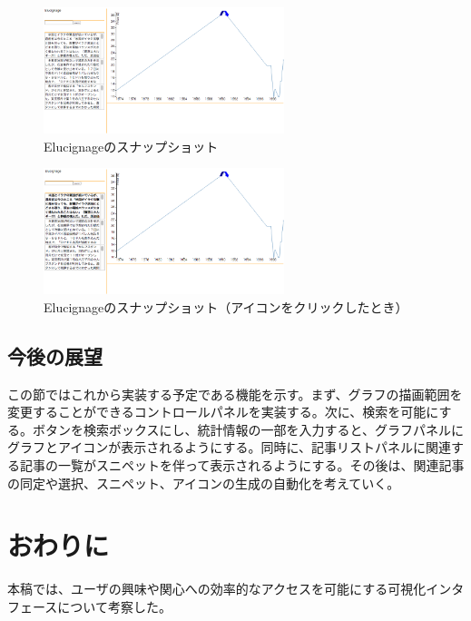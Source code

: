 \documentclass{matsushita-zemi}
\begin{document}
\begin{figure}[tb]
  \begin{center}
   \includegraphics[width=7cm,bb=0 0 852 448]{Elucignageprototype.png}
  \end{center}
 \caption{Elucignageのスナップショット}
 \label{Elucignage}
\end{figure}
\begin{figure}[tb]
  \begin{center}
   \includegraphics[width=7cm,bb=0 0 853 448]{Elucignage_click.png}
  \end{center}
 \caption{Elucignageのスナップショット（アイコンをクリックしたとき）}
 \label{Elucignage_click}
\end{figure}

\subsection{今後の展望}
この節ではこれから実装する予定である機能を示す。まず、グラフの描画範囲を変更することができるコントロールパネルを実装する。次に、検索を可能にする。ボタンを検索ボックスにし、統計情報の一部を入力すると、グラフパネルにグラフとアイコンが表示されるようにする。同時に、記事リストパネルに関連する記事の一覧がスニペットを伴って表示されるようにする。その後は、関連記事の同定や選択、スニペット、アイコンの生成の自動化を考えていく。


\section{おわりに}
本稿では、ユーザの興味や関心への効率的なアクセスを可能にする可視化インタフェースについて考察した。



\end{document}
